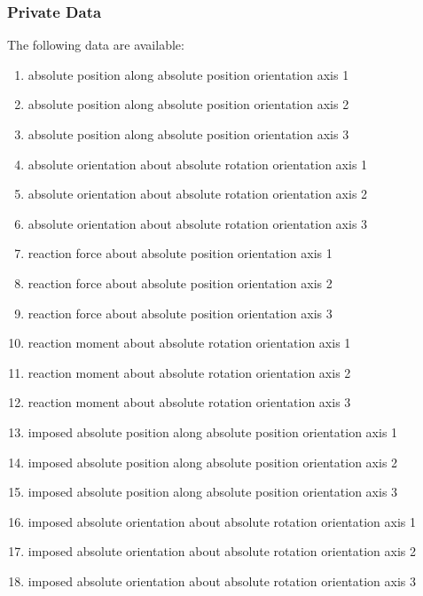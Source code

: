 \subsubsection{Private Data}
The following data are available:
\begin{enumerate}
\item {} absolute position along absolute position orientation axis 1
\item {} absolute position along absolute position orientation axis 2
\item {} absolute position along absolute position orientation axis 3

\item {} absolute orientation about absolute rotation orientation axis 1
\item {} absolute orientation about absolute rotation orientation axis 2
\item {} absolute orientation about absolute rotation orientation axis 3

\item {} reaction force about absolute position orientation axis 1
\item {} reaction force about absolute position orientation axis 2
\item {} reaction force about absolute position orientation axis 3

\item {} reaction moment about absolute rotation orientation axis 1
\item {} reaction moment about absolute rotation orientation axis 2
\item {} reaction moment about absolute rotation orientation axis 3

\item {} imposed absolute position along absolute position orientation axis 1
\item {} imposed absolute position along absolute position orientation axis 2
\item {} imposed absolute position along absolute position orientation axis 3

\item {} imposed absolute orientation about absolute rotation orientation axis 1
\item {} imposed absolute orientation about absolute rotation orientation axis 2
\item {} imposed absolute orientation about absolute rotation orientation axis 3


\end{enumerate}
